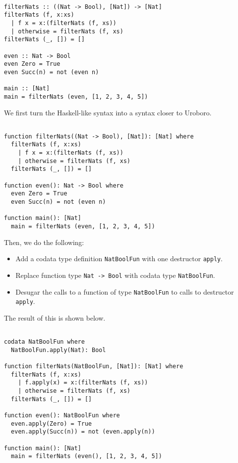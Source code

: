 \begin{lstlisting}

filterNats :: ((Nat -> Bool), [Nat]) -> [Nat]
filterNats (f, x:xs)
  | f x = x:(filterNats (f, xs))
  | otherwise = filterNats (f, xs)
filterNats (_, []) = []

even :: Nat -> Bool
even Zero = True
even Succ(n) = not (even n)

main :: [Nat]
main = filterNats (even, [1, 2, 3, 4, 5])

\end{lstlisting}

We first turn the Haskell-like syntax into a syntax closer to Uroboro.

\begin{lstlisting}

function filterNats((Nat -> Bool), [Nat]): [Nat] where
  filterNats (f, x:xs)
    | f x = x:(filterNats (f, xs))
    | otherwise = filterNats (f, xs)
  filterNats (_, []) = []

function even(): Nat -> Bool where
  even Zero = True
  even Succ(n) = not (even n)

function main(): [Nat]
  main = filterNats (even, [1, 2, 3, 4, 5])

\end{lstlisting}

Then, we do the following:
\begin{itemize}
\item Add a codata type definition \texttt{NatBoolFun} with one destructor \texttt{apply}.

\item Replace function type \texttt{Nat -> Bool} with codata type \texttt{NatBoolFun}.

\item Desugar the calls to a function of type \texttt{NatBoolFun} to calls to destructor \texttt{apply}.
\end{itemize}
The result of this is shown below.

\begin{lstlisting}

codata NatBoolFun where
  NatBoolFun.apply(Nat): Bool

function filterNats(NatBoolFun, [Nat]): [Nat] where
  filterNats (f, x:xs)
    | f.apply(x) = x:(filterNats (f, xs))
    | otherwise = filterNats (f, xs)
  filterNats (_, []) = []

function even(): NatBoolFun where
  even.apply(Zero) = True
  even.apply(Succ(n)) = not (even.apply(n))

function main(): [Nat]
  main = filterNats (even(), [1, 2, 3, 4, 5])

\end{lstlisting}

